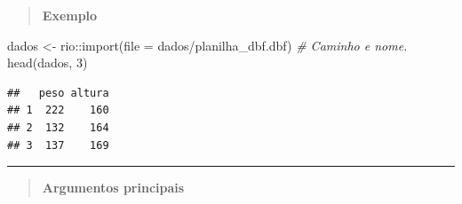 \documentclass[
]{book}
\newenvironment{Shaded}{\begin{snugshade}}{\end{snugshade}}
\newcommand{\AttributeTok}[1]{\textcolor[rgb]{0.77,0.63,0.00}{#1}}
\newcommand{\CommentTok}[1]{\textcolor[rgb]{0.56,0.35,0.01}{\textit{#1}}}
\newcommand{\DecValTok}[1]{\textcolor[rgb]{0.00,0.00,0.81}{#1}}
\newcommand{\FunctionTok}[1]{\textcolor[rgb]{0.00,0.00,0.00}{#1}}
\newcommand{\NormalTok}[1]{#1}
\newcommand{\OtherTok}[1]{\textcolor[rgb]{0.56,0.35,0.01}{#1}}
\newcommand{\SpecialCharTok}[1]{\textcolor[rgb]{0.00,0.00,0.00}{#1}}
\newcommand{\StringTok}[1]{\textcolor[rgb]{0.31,0.60,0.02}{#1}}
\theoremstyle{definition}
\theoremstyle{definition}
\theoremstyle{definition}
\theoremstyle{definition}
\theoremstyle{remark}
\begin{document}
\begin{quote}
\textbf{Exemplo}
\end{quote}

\begin{Shaded}
\begin{Highlighting}[]
\NormalTok{dados }\OtherTok{\textless{}{-}}\NormalTok{ rio}\SpecialCharTok{::}\FunctionTok{import}\NormalTok{(}\AttributeTok{file =} \StringTok{\textquotesingle{}dados/planilha\_dbf.dbf\textquotesingle{}}\NormalTok{) }\CommentTok{\# Caminho e nome.}
\FunctionTok{head}\NormalTok{(dados, }\DecValTok{3}\NormalTok{)}
\end{Highlighting}
\end{Shaded}

\begin{verbatim}
##   peso altura
## 1  222    160
## 2  132    164
## 3  137    169
\end{verbatim}

\begin{center}\rule{0.5\linewidth}{0.5pt}\end{center}

\begin{quote}
\textbf{Argumentos principais}
\end{quote}
\end{document}
